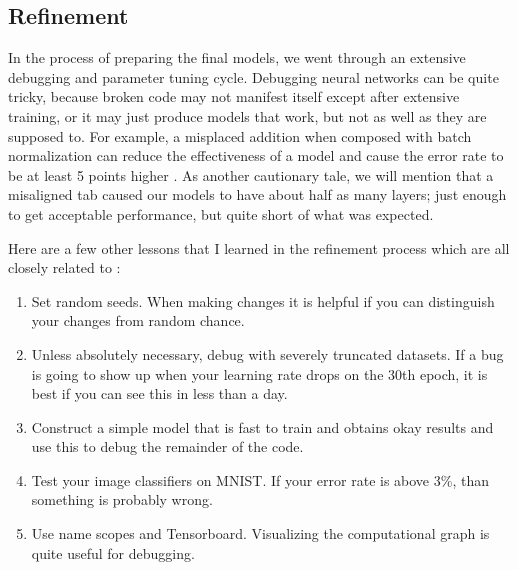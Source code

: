 \documentclass[english,a4paper,oneside]{amsart}
\theoremstyle{definition}
\begin{document}


\subsection{Refinement}
In the process of preparing the final models, we went through an extensive debugging and parameter tuning cycle. Debugging neural networks can be quite tricky, because broken code may not manifest itself except after extensive training, or it may just produce models that work, but not as well as they are supposed to. For example, a misplaced addition when composed with batch normalization can reduce the effectiveness of a model and cause the error rate to be at least 5 points higher \cite{Preactive}.  As another cautionary tale, we will mention that a misaligned tab caused our models to have about half as many layers; just enough to get acceptable performance, but quite short of what was expected. 

Here are a few other lessons that I learned in the refinement process which are all closely related to :
\begin{enumerate}
	\item Set random seeds. When making changes it is helpful if you can distinguish your changes from random chance.
	\item Unless absolutely necessary, debug with severely truncated datasets. If a bug is going to show up when your learning rate drops on the 30th epoch, it is best if you can see this in less than a day.
	\item Construct a simple model that is fast to train and obtains okay results and use this to debug the remainder of the code.
	\item Test your image classifiers on MNIST. If your error rate is above 3\%, than something is probably wrong.
	\item Use name scopes and Tensorboard. Visualizing the computational graph is quite useful for debugging. 
\end{enumerate}
\end{document}
